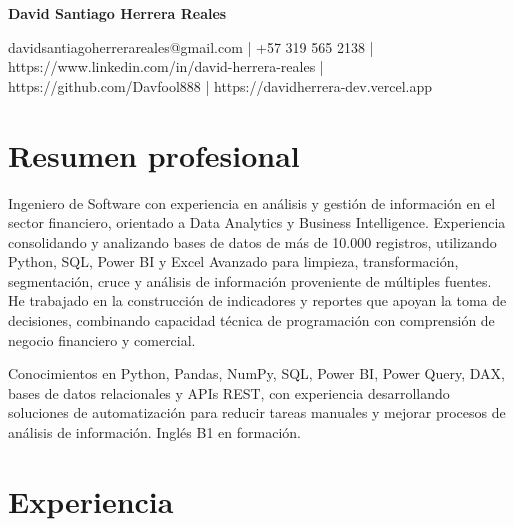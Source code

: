 \documentclass[10pt,a4paper]{article}
\begin{document}
\begin{center}
{\LARGE \textbf{David Santiago Herrera Reales}} \\[3pt]

\vspace{5pt}

davidsantiagoherrerareales@gmail.com | +57 319 565 2138 | https://www.linkedin.com/in/david-herrera-reales | https://github.com/Davfool888 | https://davidherrera-dev.vercel.app

\end{center}

\section*{Resumen profesional}
Ingeniero de Software con experiencia en análisis y gestión de información en el sector financiero, orientado a Data Analytics y Business Intelligence. Experiencia consolidando y analizando bases de datos de más de 10.000 registros, utilizando Python, SQL, Power BI y Excel Avanzado para limpieza, transformación, segmentación, cruce y análisis de información proveniente de múltiples fuentes. He trabajado en la construcción de indicadores y reportes que apoyan la toma de decisiones, combinando capacidad técnica de programación con comprensión de negocio financiero y comercial.

Conocimientos en Python, Pandas, NumPy, SQL, Power BI, Power Query, DAX, bases de datos relacionales y APIs REST, con experiencia desarrollando soluciones de automatización para reducir tareas manuales y mejorar procesos de análisis de información. Inglés B1 en formación.


\section*{Experiencia}
\end{document}
